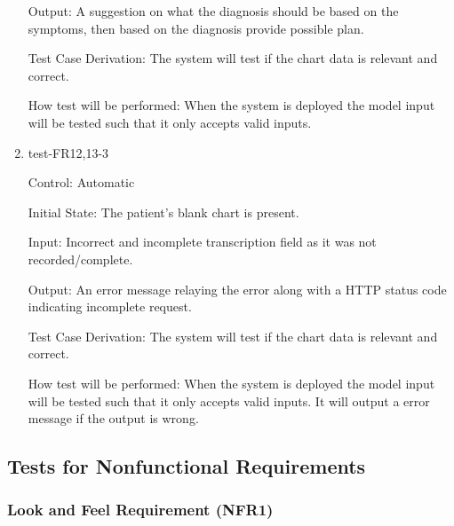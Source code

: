 \documentclass[12pt, titlepage]{article}
\begin{document}
\begin{enumerate}
Output: A suggestion on what the diagnosis should be based on the symptoms, then based on the diagnosis provide possible plan.

Test Case Derivation: The system will test if the chart data is relevant and correct.  

How test will be performed: When the system is deployed the model input will be tested such that it only accepts valid inputs.

\item{test-FR12,13-3} \label{test-FR12,13-3}

Control: Automatic

Initial State: The patient's blank chart is present.

Input: Incorrect and incomplete transcription field as it was not recorded/complete.

Output: An error message relaying the error along with a HTTP status code indicating incomplete request.

Test Case Derivation: The system will test if the chart data is relevant and correct.  

How test will be performed: When the system is deployed the model input will be tested such that it only accepts valid inputs. It will output a error message if the output is wrong.

\end{enumerate}


\subsection{Tests for Nonfunctional Requirements} \label{section:4.2}

\subsubsection{Look and Feel Requirement (NFR1)} \label{section:4.2.1}
\end{document}
